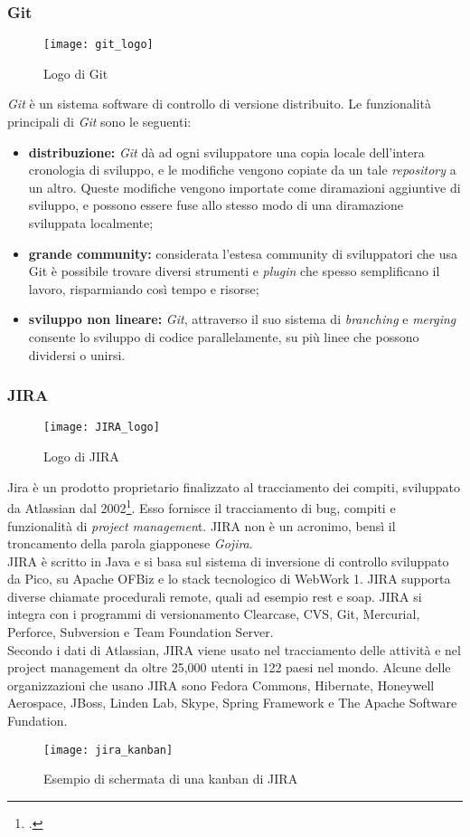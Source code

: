 \subsubsection{Git}
\begin{figure}[htb] 
    \centering 
    \texttt{[image: git\_logo]} 
    \caption{Logo di Git}
\end{figure}
\emph{Git} è un sistema software di controllo di versione distribuito. Le funzionalità principali di \emph{Git} sono le seguenti:
\begin{itemize}
	\item \textbf{distribuzione:} \emph{Git} dà ad ogni sviluppatore una copia locale dell'intera cronologia di sviluppo, e le modifiche vengono copiate da un tale \emph{repository} a un altro. Queste modifiche vengono importate come diramazioni aggiuntive di sviluppo, e possono essere fuse allo stesso modo di una diramazione sviluppata localmente;
	\item \textbf{grande community:} considerata l’estesa community di sviluppatori che usa Git è possibile trovare diversi strumenti e \emph{plugin} che spesso semplificano il lavoro, risparmiando così tempo e risorse;
	\item \textbf{sviluppo non lineare:} \emph{Git}, attraverso il suo sistema di \emph{branching} e \emph{merging} consente lo sviluppo di codice parallelamente, su più linee che possono dividersi o unirsi.
\end{itemize}

\subsubsection{JIRA}
\begin{figure}[htb] 
    \centering 
    \texttt{[image: JIRA\_logo]} 
    \caption{Logo di JIRA}
\end{figure}
Jira è un prodotto proprietario finalizzato al tracciamento dei compiti, sviluppato da Atlassian dal 2002\footcite{atlassian:jira}. Esso fornisce il tracciamento di bug, compiti e funzionalità di \emph{project managemen}t. JIRA non è un acronimo, bensì il troncamento della parola giapponese \emph{Gojira}.\\
JIRA è scritto in Java e si basa sul sistema di inversione di controllo sviluppato da Pico, su Apache OFBiz e lo stack tecnologico di WebWork 1. JIRA supporta diverse chiamate procedurali remote, quali ad esempio \gls{rest} e \gls{soap}\glsfirstoccur. JIRA si integra con i programmi di versionamento Clearcase, CVS, Git, Mercurial, Perforce, Subversion e Team Foundation Server.\\
Secondo i dati di Atlassian, JIRA viene usato nel tracciamento delle attività e nel project management da oltre 25,000 utenti in 122 paesi nel mondo. Alcune delle organizzazioni che usano JIRA sono Fedora Commons, Hibernate, Honeywell Aerospace, JBoss, Linden Lab, Skype, Spring Framework e The Apache Software Fundation.
\begin{figure}[H] 
    \centering 
    \texttt{[image: jira\_kanban]} 
    \caption{Esempio di schermata di una kanban di JIRA}
\end{figure}

